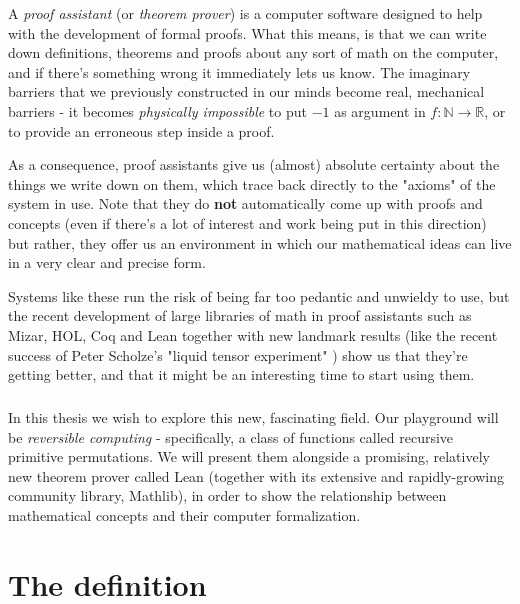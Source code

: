 \documentclass{book}
\theoremstyle{definition}
\theoremstyle{remark}
\theoremstyle{plain}
\newcommand{\NN}{\mathbb{N}}
\newcommand{\RR}{\mathbb{R}}
\begin{document}
A \textit{proof assistant} (or \textit{theorem prover}) is a computer software designed to help with
the development of formal proofs.
What this means, is that we can write down definitions, theorems and proofs about any sort of math on the computer,
and if there's something wrong it immediately lets us know.
The imaginary barriers that we previously constructed in our minds become
real, mechanical barriers - it becomes \textit{physically impossible} to put $-1$ as argument in $f : \NN \to \RR$,
or to provide an erroneous step inside a proof.

As a consequence, proof assistants give us (almost) absolute certainty about the things we write down on them,
which trace back directly to the "axioms" of the system in use.
Note that they do \textbf{not} automatically come up with proofs and concepts
(even if there's a lot of interest and work being put in this direction) but rather,
they offer us an environment in which our mathematical ideas can live in a very clear and precise form.

Systems like these run the risk of being far too pedantic and unwieldy to use,
but the recent development of large libraries of math in proof assistants such as Mizar, HOL, Coq and Lean
together with new landmark results (like the recent success of Peter Scholze's "liquid tensor experiment" \cite{quanta})
show us that they're getting better, and that it might be an interesting time to start using them.

\paragraph{}

In this thesis we wish to explore this new, fascinating field.
Our playground will be \textit{reversible computing} - specifically, a class of functions
called recursive primitive permutations. We will present them alongside a promising, relatively new theorem prover
called Lean (together with its extensive and rapidly-growing community library, Mathlib),
in order to show the relationship between mathematical concepts and their computer formalization.


% 
% 

\chapter{The definition}
\end{document}
